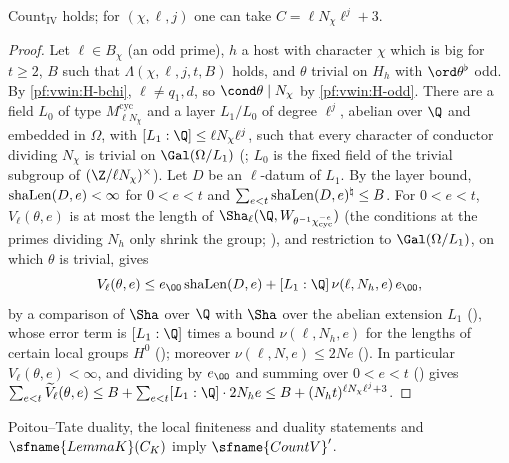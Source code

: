 \begin{proposition}\label{pf:vwin:countIV}
$\mathrm{Count}_{\mathrm{IV}}$ holds; for $(\chi,\ell,j)$ one can take $C=\ell N_\chi\ell^j+3$.
\end{proposition}

\begin{proof}
Let $\ell\in B_\chi$ (an odd prime), $h$ a host with character $\chi$ which is big for $t\ge2$, $B$ such that $\Lambda(\chi,\ell,j,t,B)$ holds, and
$\theta$ trivial on $H_h$ with $\ord\theta^\flat$ odd. By \ref{pf:vwin:H-bchi}, $\ell\ne q_1,d$, so $\cond\theta\mid N_\chi$ by \ref{pf:vwin:H-odd}.
There are a field $L_0$ of type $M^{\mathrm{cyc}}_{\ell N_\chi}$ and a layer $L_1/L_0$ of degree $\ell^j$, abelian over $\Q$ and embedded in $\Omega$,
with $[L_1:\Q]\le\ell N_\chi\ell^j$, such that every character of conductor dividing $N_\chi$ is trivial on $\Gal(\Omega/L_1)$
(; $L_0$ is the fixed field of the trivial subgroup of $(\Z/\ell N_\chi)^\times$). Let $D$ be an
$\ell$-datum of $L_1$. By the layer bound, $\mathrm{shaLen}(D,e)<\infty$ for $0<e<t$ and $\sum_{e<t}\mathrm{shaLen}(D,e)^\natural\le B$. For $0<e<t$,
$V_\ell(\theta,e)$ is at most the length of $\Sha_\ell(\Q,W_{\theta^{-1}\vwincyc^{-e}})$ (the conditions at the primes dividing $N_h$ only shrink
the group; ), and restriction to $\Gal(\Omega/L_1)$, on which $\theta$ is trivial, gives
\[
 V_\ell(\theta,e)\le e_\OO\,\vwinsh(D,e)+[L_1:\Q]\,\nu(\ell,N_h,e)\,e_\OO ,
\]
by a comparison of $\Sha$ over $\Q$ with $\Sha$ over the abelian extension $L_1$ (), whose error
term is $[L_1:\Q]$ times a bound $\nu(\ell,N_h,e)$ for the lengths of certain local groups $H^0$
(); moreover $\nu(\ell,N,e)\le2Ne$ (). In particular $V_\ell(\theta,e)<\infty$, and dividing by $e_\OO$ and summing over $0<e<t$
() gives $\sum_{e<t}\vwinVt_\ell(\theta,e)\le B+\sum_{e<t}[L_1:\Q]\cdot2N_he\le B+(N_ht)^{\ell N_\chi\ell^j+3}$.
\end{proof}

\begin{proposition}\label{pf:vwin:countVs}
Poitou--Tate duality, the local finiteness and duality statements and $\sfname{LemmaK}(C_K)$ imply $\sfname{CountV}'$.
\end{proposition}

